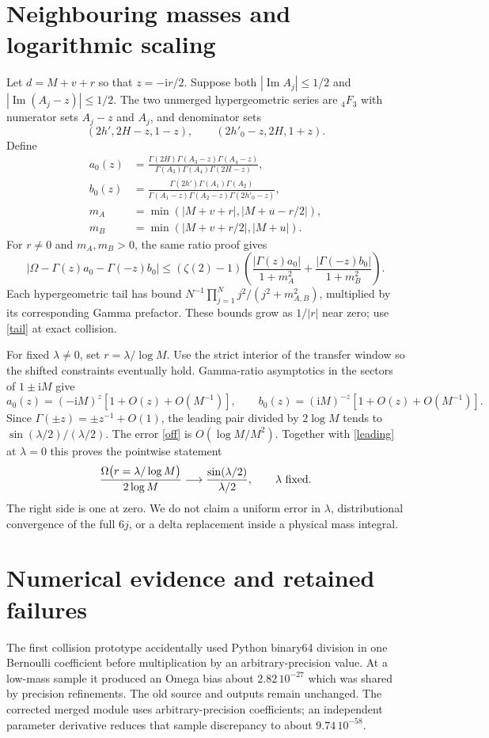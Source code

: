 \documentclass[11pt,a4paper]{article}
\newcommand{\Om}{\Omega}
\newcommand{\ii}{\mathrm i}
\begin{document}
\section{Neighbouring masses and logarithmic scaling}
Let $d=M+v+r$ so that $z=-\ii r/2$.
Suppose both $|\operatorname{Im}A_j|\le1/2$ and
$|\operatorname{Im}(A_j-z)|\le1/2$.
The two unmerged hypergeometric series are $\!{}_4F_3$ with numerator
sets $A_j-z$ and $A_j$, and denominator sets
\[
 (2h',2H-z,1-z),\qquad (2h'_0-z,2H,1+z).
\]
Define
\begin{align*}
 a_0(z)&=\frac{\Gamma(2H)\Gamma(A_3-z)\Gamma(A_4-z)}
                {\Gamma(A_3)\Gamma(A_4)\Gamma(2H-z)},\\
 b_0(z)&=\frac{\Gamma(2h')\Gamma(A_1)\Gamma(A_2)}
                {\Gamma(A_1-z)\Gamma(A_2-z)\Gamma(2h'_0-z)},\\
 m_A&=\min(|M+v+r|,|M+u-r/2|),\\
 m_B&=\min(|M+v+r/2|,|M+u|).
\end{align*}
For $r\ne0$ and $m_A,m_B>0$, the same ratio proof gives
\begin{equation}
 \left|\Om-\Gamma(z)a_0-\Gamma(-z)b_0\right|
 \le(\zeta(2)-1)
 \left(\frac{|\Gamma(z)a_0|}{1+m_A^2}
      +\frac{|\Gamma(-z)b_0|}{1+m_B^2}\right). \label{off}
\end{equation}
Each hypergeometric tail has bound
$N^{-1}\prod_{j=1}^N j^2/(j^2+m_{A,B}^2)$,
multiplied by its corresponding Gamma prefactor.
These bounds grow as $1/|r|$ near zero;
use \eqref{tail} at exact collision.

For fixed $\lambda\ne0$, set $r=\lambda/\log M$.
Use the strict interior of the transfer window so the shifted
constraints eventually hold. Gamma-ratio asymptotics in the sectors
of $1\pm\ii M$ give
\[
 a_0(z)=(-\ii M)^z[1+O(z)+O(M^{-1})],\qquad
 b_0(z)=(\ii M)^{-z}[1+O(z)+O(M^{-1})].
\]
Since $\Gamma(\pm z)=\pm z^{-1}+O(1)$, the leading pair divided by
$2\log M$ tends to $\sin(\lambda/2)/(\lambda/2)$.
The error \eqref{off} is $O(\log M/M^2)$.
Together with \eqref{leading} at $\lambda=0$ this proves the
pointwise statement
\begin{equation}
 \frac{\Om\bigl(r=\lambda/\log M\bigr)}{2\log M}
 \longrightarrow \frac{\sin(\lambda/2)}{\lambda/2},
 \qquad \lambda\ \hbox{fixed}. \label{scaling}
\end{equation}
The right side is one at zero. We do not claim a uniform error in
$\lambda$, distributional convergence of the full $6j$, or a delta
replacement inside a physical mass integral.

\section{Numerical evidence and retained failures}

The first collision prototype accidentally used Python binary64
division in one Bernoulli coefficient before multiplication by an
arbitrary-precision value. At a low-mass sample it produced an
Omega bias about $2.82\,10^{-27}$ which was shared by precision
refinements. The old source and outputs remain unchanged.
The corrected merged module uses arbitrary-precision coefficients;
an independent parameter derivative reduces that sample discrepancy
to about $9.74\,10^{-58}$.
\end{document}
